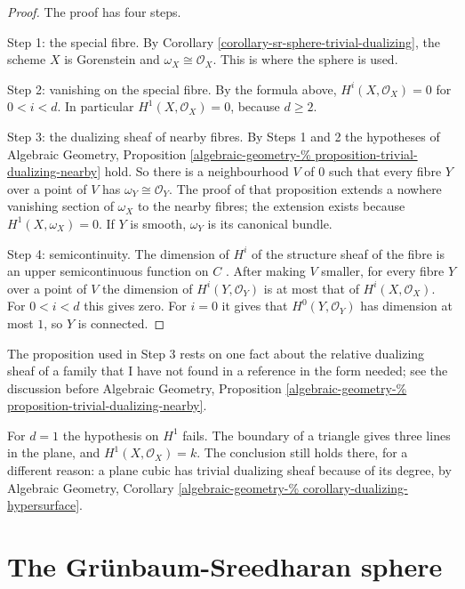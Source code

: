 \begin{proof}
The proof has four steps.

Step 1: the special fibre. By Corollary
\ref{corollary-sr-sphere-trivial-dualizing},
the scheme $X$ is Gorenstein and
$\omega_X\cong\mathcal{O}_X$. This is where
the sphere is used.

Step 2: vanishing on the special fibre. By
the formula above, $H^i(X,\mathcal{O}_X)=0$
for $0<i<d$. In particular
$H^1(X,\mathcal{O}_X)=0$, because $d\geq 2$.

Step 3: the dualizing sheaf of nearby fibres.
By Steps 1 and 2 the hypotheses of Algebraic
Geometry, Proposition
\ref{algebraic-geometry-%
proposition-trivial-dualizing-nearby}
hold. So there is a neighbourhood $V$ of $0$
such that every fibre $Y$ over a point of $V$
has $\omega_Y\cong\mathcal{O}_Y$. The proof
of that proposition extends a nowhere
vanishing section of $\omega_X$ to the nearby
fibres; the extension exists because
$H^1(X,\omega_X)=0$. If $Y$ is smooth,
$\omega_Y$ is its canonical bundle.

Step 4: semicontinuity. The dimension of
$H^i$ of the structure sheaf of the fibre is
an upper semicontinuous function on $C$
\cite[III, Theorem 12.8]{har}. After making
$V$ smaller, for every fibre $Y$ over a point
of $V$ the dimension of
$H^i(Y,\mathcal{O}_Y)$ is at most that of
$H^i(X,\mathcal{O}_X)$. For $0<i<d$ this
gives zero. For $i=0$ it gives that
$H^0(Y,\mathcal{O}_Y)$ has dimension at most
$1$, so $Y$ is connected.
\end{proof}

The proposition used in Step 3 rests on one
fact about the relative dualizing sheaf of a
family that I have not found in a reference
in the form needed; see the discussion before
Algebraic Geometry, Proposition
\ref{algebraic-geometry-%
proposition-trivial-dualizing-nearby}.

For $d=1$ the hypothesis on $H^1$ fails.
The boundary of a triangle gives three
lines in the plane, and
$H^1(X,\mathcal{O}_X)=k$. The conclusion
still holds there, for a different
reason: a plane cubic has trivial
dualizing sheaf because of its degree,
by Algebraic Geometry, Corollary
\ref{algebraic-geometry-%
corollary-dualizing-hypersurface}.

\section{The Grünbaum-Sreedharan sphere}
\label{section-grunbaum-sphere}

